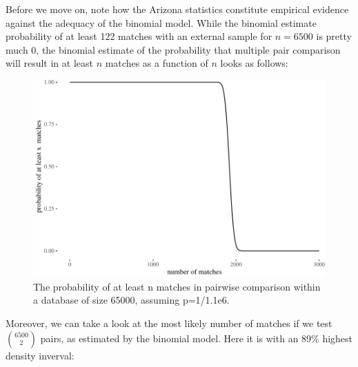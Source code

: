 \documentclass[10pt,dvipsnames,enabledeprecatedfontcommands]{scrartcl}
\begin{document}
Before we move on, note how the Arizona statistics constitute empirical
evidence against the adequacy of the binomial model. While the binomial
estimate probability of at least 122 matches with an external sample for
\(n=6500\) is pretty much 0, the binomial estimate of the probability
that multiple pair comparison will result in at least \(n\) matches as a
function of \(n\) looks as follows:

\begin{figure}

{\centering \includegraphics[width=1\linewidth]{lr-chapter2_files/figure-latex/unnamed-chunk-6-1} 

}

\caption{The probability of at least n matches in pairwise comparison within a database of size 65000, assuming p=1/1.1e6.}\label{fig:unnamed-chunk-6}
\end{figure}

\noindent Moreover, we can take a look at the most likely number of
matches if we test \({6500 \choose 2}\) pairs, as estimated by the
binomial model. Here it is with an 89\% highest density inverval:
\end{document}
